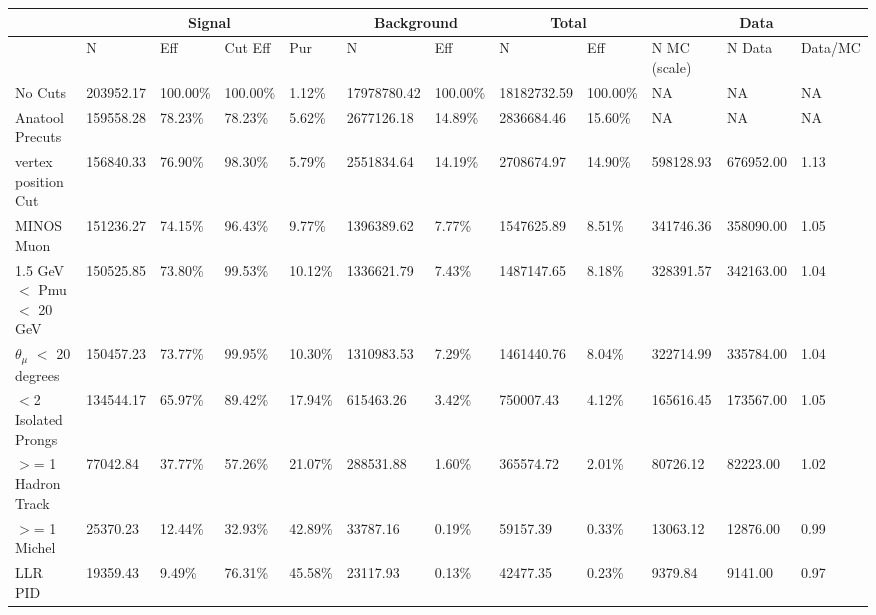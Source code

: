 \begin{table}
    \tiny
    \centering
    \begin{tabular}{|*{12}{l|}}


    \hline
    & \multicolumn{4}{c|}{Signal} & \multicolumn{2}{c|}{Background} & \multicolumn{2}{c|}{Total} & \multicolumn{3}{c|}{Data} \\
    \hline
& N     & Eff     & Cut Eff & Pur    & N         & Eff     & N         & Eff     & N MC (scale) & N Data    & Data/MC \\\hline

 No Cuts   & 203952.17     & 100.00\% & 100.00\% &   1.12\% & 17978780.42 & 100.00\% & 18182732.59 & 100.00\% & NA & NA & NA \\ \hline
 Anatool Precuts   & 159558.28     &  78.23\% &  78.23\% &   5.62\% & 2677126.18 &  14.89\% & 2836684.46 &  15.60\% & NA & NA & NA \\ \hline
 vertex position Cut   & 156840.33     &  76.90\% &  98.30\% &   5.79\% & 2551834.64 &  14.19\% & 2708674.97     &  14.90\% & 598128.93     & 676952.00 &   1.13 \\ \hline
 MINOS Muon   & 151236.27     &  74.15\% &  96.43\% &   9.77\% & 1396389.62 &   7.77\% & 1547625.89     &   8.51\% & 341746.36     & 358090.00 &   1.05 \\ \hline
 1.5 GeV $<$ Pmu $<$ 20 GeV   & 150525.85     &  73.80\% &  99.53\% &  10.12\% & 1336621.79 &   7.43\% & 1487147.65     &   8.18\% & 328391.57     & 342163.00 &   1.04 \\ \hline
 $\theta_{\mu}$ $<$ 20 degrees   & 150457.23     &  73.77\% &  99.95\% &  10.30\% & 1310983.53 &   7.29\% & 1461440.76     &   8.04\% & 322714.99     & 335784.00 &   1.04 \\ \hline
 $<$2 Isolated Prongs   & 134544.17     &  65.97\% &  89.42\% &  17.94\% & 615463.26 &   3.42\% & 750007.43     &   4.12\% & 165616.45     & 173567.00 &   1.05 \\ \hline
 $>$= 1 Hadron Track   & 77042.84     &  37.77\% &  57.26\% &  21.07\% & 288531.88 &   1.60\% & 365574.72     &   2.01\% & 80726.12     & 82223.00 &   1.02 \\ \hline
 $>$= 1 Michel   & 25370.23     &  12.44\% &  32.93\% &  42.89\% & 33787.16 &   0.19\% & 59157.39     &   0.33\% & 13063.12     & 12876.00 &   0.99 \\ \hline
 LLR PID   & 19359.43     &   9.49\% &  76.31\% &  45.58\% & 23117.93 &   0.13\% & 42477.35     &   0.23\% & 9379.84     & 9141.00 &   0.97 \\ \hline

\end{tabular}
\end{table}
